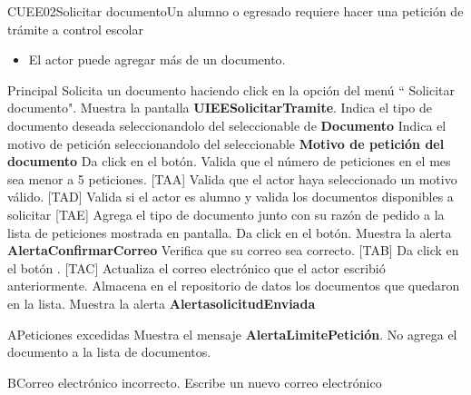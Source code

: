 \begin{UseCase}{CUEE02}{Solicitar documento}{Un alumno o egresado requiere hacer una petición de trámite a control escolar}
{\begin{itemize}
\begin{itemize}
			\end{itemize}
			\item El actor puede agregar más de un documento.
		\end{itemize}
  }
\end{UseCase}

\begin{UCtrayectoria}{Principal}
  \UCpaso[\UCactor] Solicita un documento haciendo click en la opción del menú `` Solicitar documento".
  \UCpaso Muestra la pantalla  {\bf UIEESolicitarTramite}.
  \UCpaso[\UCactor] Indica el tipo de documento deseada seleccionandolo del seleccionable de {\bf Documento } 
  \UCpaso[\UCactor] Indica el motivo de petición seleccionandolo del seleccionable {\bf Motivo de petición del documento}
  \UCpaso[\UCactor] Da click en el botón. 
  \UCpaso  Valida que el número de peticiones en el mes sea menor a 5 peticiones. [TAA] 
  \UCpaso Valida que el actor haya seleccionado un motivo válido. [TAD]
  \UCpaso Valida si el actor es alumno y valida los documentos disponibles a solicitar [TAE]
  \UCpaso Agrega el tipo de documento junto con su razón de pedido a la lista de peticiones mostrada en pantalla.
  \UCpaso[\UCactor]  Da click en el botón.
  \UCpaso Muestra la alerta {\bf AlertaConfirmarCorreo} 
  \UCpaso[\UCactor] Verifica que su correo sea correcto. [TAB]
  \UCpaso[\UCactor] Da click en el botón . [TAC]
  \UCpaso Actualiza el correo electrónico que el actor escribió anteriormente.
  \UCpaso Almacena en el repositorio de datos los documentos que quedaron en la lista.
  \UCpaso Muestra la alerta  {\bf AlertasolicitudEnviada}
\end{UCtrayectoria}

\begin{UCtrayectoriaA}{A}{Peticiones excedidas} 
\UCpaso Muestra el mensaje {\bf AlertaLimitePetición}.
  \UCpaso No agrega el documento a la lista de documentos.
\end{UCtrayectoriaA}

\begin{UCtrayectoriaA}{B}{Correo electrónico incorrecto.} 
  \UCpaso[\UCactor] Escribe un nuevo correo electrónico 
\end{UCtrayectoriaA}

